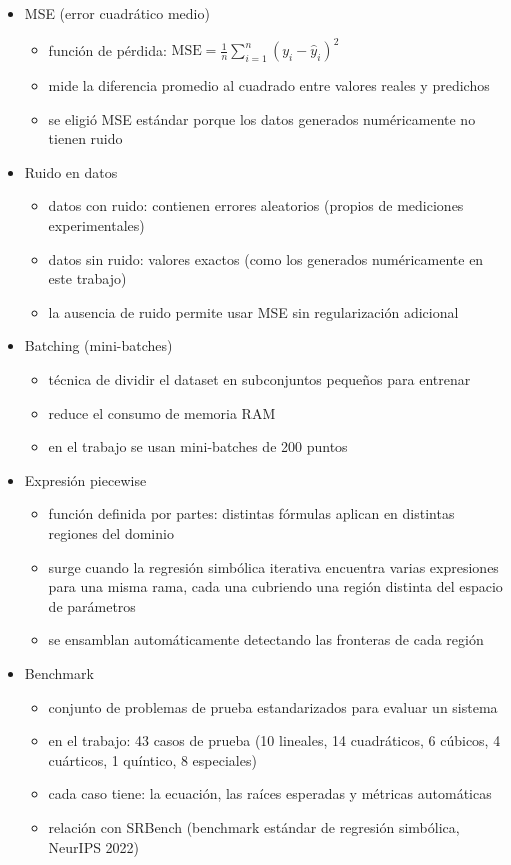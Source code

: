 \documentclass{article}
\begin{document}
\begin{itemize}[leftmargin=1.5em]
  \item MSE (error cuadrático medio)
  \begin{itemize}
\item función de pérdida: $\text{MSE} = \frac{1}{n}\sum_{i=1}^{n}(y_i - \hat{y}_i)^2$ \item mide la diferencia promedio al cuadrado entre valores reales y predichos \item se eligió MSE estándar porque los datos generados numéricamente no tienen ruido
  \end{itemize}

  \item Ruido en datos
  \begin{itemize}
\item datos con ruido: contienen errores aleatorios (propios de mediciones experimentales) \item datos sin ruido: valores exactos (como los generados numéricamente en este trabajo) \item la ausencia de ruido permite usar MSE sin regularización adicional
  \end{itemize}

  \item Batching (mini-batches)
  \begin{itemize}
\item técnica de dividir el dataset en subconjuntos pequeños para entrenar \item reduce el consumo de memoria RAM \item en el trabajo se usan mini-batches de 200 puntos
  \end{itemize}

  \item Expresión piecewise
  \begin{itemize}
\item función definida por partes: distintas fórmulas aplican en distintas regiones del dominio \item surge cuando la regresión simbólica iterativa encuentra varias expresiones para una misma rama, cada una cubriendo una región distinta del espacio de parámetros \item se ensamblan automáticamente detectando las fronteras de cada región
  \end{itemize}

  \item Benchmark
  \begin{itemize}
\item conjunto de problemas de prueba estandarizados para evaluar un sistema \item en el trabajo: 43 casos de prueba (10 lineales, 14 cuadráticos, 6 cúbicos, 4 cuárticos, 1 quíntico, 8 especiales) \item cada caso tiene: la ecuación, las raíces esperadas y métricas automáticas \item relación con SRBench (benchmark estándar de regresión simbólica, NeurIPS 2022)
  \end{itemize}


\end{itemize}
\end{document}
